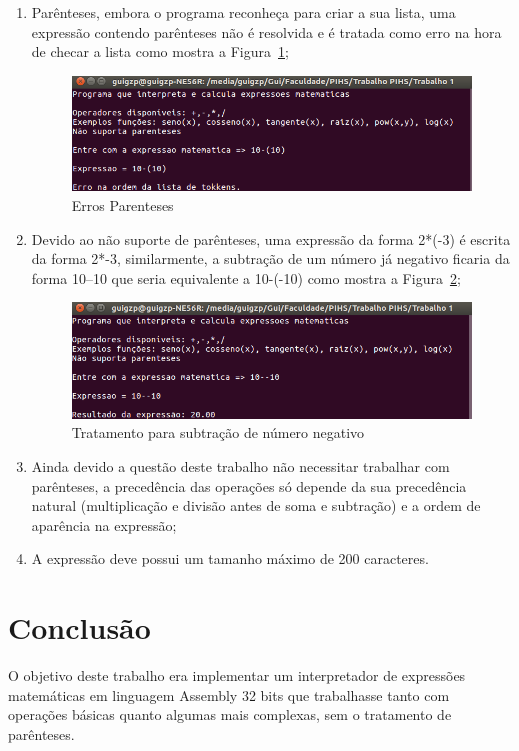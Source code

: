 \documentclass[12pt]{article}
\begin{document}
\begin{enumerate}
\item Parênteses, embora o programa reconheça para criar a sua lista, uma expressão contendo parênteses não é resolvida e é tratada como erro na hora de checar a lista como mostra a Figura~\ref{fig:erro_parenteses};

\begin{figure}[H]
\centering
\includegraphics[width=.5\textwidth]{Imagens/erro_parenteses.png}
\caption{Erros Parenteses}
\label{fig:erro_parenteses}
\end{figure}

\item Devido ao não suporte de parênteses, uma expressão da forma 2*(-3) é escrita da forma 2*-3, similarmente, a subtração de um número já negativo ficaria da forma 10--10 que seria equivalente a 10-(-10) como mostra a Figura~\ref{fig:menos};

\begin{figure}[H]
\centering
\includegraphics[width=.5\textwidth]{Imagens/dois_menos.png}
\caption{Tratamento para subtração de número negativo}
\label{fig:menos}
\end{figure}

\item Ainda devido a questão deste trabalho não necessitar trabalhar com parênteses, a precedência das operações só depende da sua precedência natural (multiplicação e divisão antes de soma e subtração) e a ordem de aparência na expressão;
\item A expressão deve possui um tamanho máximo de 200 caracteres.
\end{enumerate}

\section*{Conclusão}

O objetivo deste trabalho era implementar um interpretador de expressões matemáticas em linguagem Assembly 32 bits que trabalhasse tanto com  operações básicas quanto algumas mais complexas, sem o tratamento de parênteses.
\end{document}
